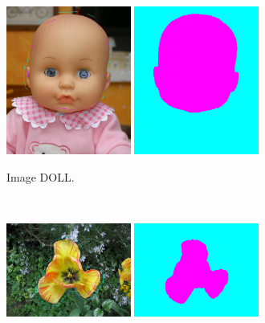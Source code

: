 \begin{figure}[htb]
	\centering	
	 \begin{subfigure}[B]{0.7\textwidth}	
			\includegraphics[width=0.45\textwidth]{images/evaluation/Milles/doll_seeds.jpg}
			\includegraphics[width=0.45\textwidth]{images/evaluation/Milles/doll_seg.png}
		 \caption{Image DOLL.}
	\end{subfigure}	
	\\
	 \begin{subfigure}[B]{0.7\textwidth}	
			\includegraphics[width=0.45\textwidth]{images/evaluation/Milles/flower_seeds.jpg}
			\includegraphics[width=0.45\textwidth]{images/evaluation/Milles/flower_seg.png}

\end{subfigure}
\end{figure}
